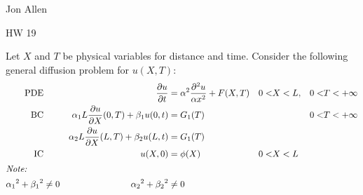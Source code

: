 \documentclass{article}
\begin{document}
Jon Allen

HW 19

Let $X$ and $T$ be physical variables for distance and time. Consider the following general diffusion problem for $u(X,T)$:
\begin{align*}
  \text{PDE}&&\frac{\partial u}{\partial t}&=\alpha^2\frac{\partial^2u}{\alpha x^2}+F(X,T)&0<&X<L,&0<&T<+\infty\\
  \text{BC}&&\alpha_1L\frac{\partial u}{\partial X}(0,T)+\beta _1u(0,t)&=G_1(T)&&&0<&T<+\infty\\
  &&\alpha_2L\frac{\partial u}{\partial X}(L,T)+\beta_2u(L,t)&=G_1(T)\\
  \text{IC}&&u(X,0)&=\phi(X)&0<&X<L\\
  \intertext{\emph{Note:}}
  {\alpha_1}^2+{\beta_1}^2&\ne0&
  {\alpha_2}^2+{\beta_2}^2&\ne0\\
\end{align*}
\end{document}
